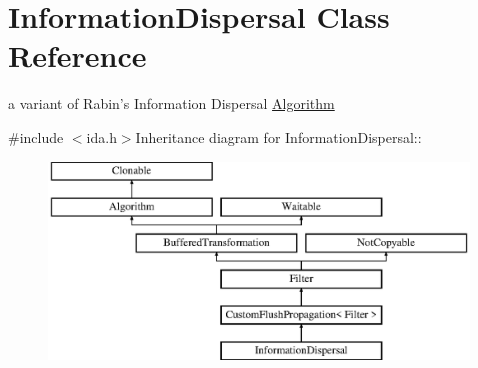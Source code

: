 \hypertarget{class_information_dispersal}{
\section{InformationDispersal Class Reference}
\label{class_information_dispersal}
}


a variant of Rabin's Information Dispersal \hyperlink{class_algorithm}{Algorithm}  


{\ttfamily \#include $<$ida.h$>$}Inheritance diagram for InformationDispersal::\begin{figure}[H]
\begin{center}
\leavevmode
\includegraphics[height=5.25822cm]{class_information_dispersal}
\end{center}
\end{figure}

